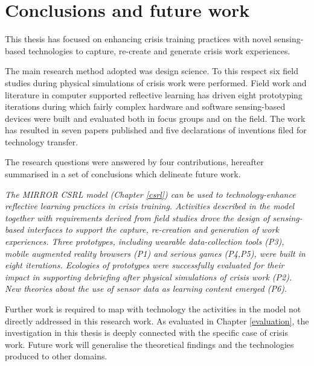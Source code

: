 \chapter{Conclusions and future work}\label{conclusions}


This thesis has focused on enhancing crisis training practices with novel sensing-based technologies to capture, re-create and generate crisis work experiences.

The main research method adopted was design science. To this respect six field studies during physical simulations of crisis work were performed. Field work and literature in computer supported reflective learning has driven eight prototyping iterations during which fairly complex hardware and software sensing-based devices were built and evaluated both in focus groups and on the field. The work has resulted in seven papers published and five declarations of inventions filed for technology transfer.

The research questions were answered by four contributions, hereafter summarised in a set of conclusions which delineate future work. 
	
\begin{framed}
\emph{The MIRROR CSRL model (Chapter \ref{csrl}) can be used to technology-enhance reflective learning practices in crisis training. Activities described in the model together with requirements derived from field studies drove the design of sensing-based interfaces to support the capture, re-creation and generation of work experiences. Three prototypes, including wearable data-collection tools (P3), mobile augmented reality browsers (P1) and serious games (P4,P5), were built in eight iterations. Ecologies of prototypes were successfully evaluated for their impact in supporting debriefing after physical simulations of crisis work (P2). New theories about the use of sensor data as learning content emerged (P6).}
\par
Further work is required to map with technology the activities in the model not directly addressed in this research work. As evaluated in Chapter \ref{evaluation}, the investigation in this thesis is deeply connected with the specific case of crisis work. Future work will generalise the theoretical findings and the technologies produced to other domains. 
\end{framed}
\newpage

